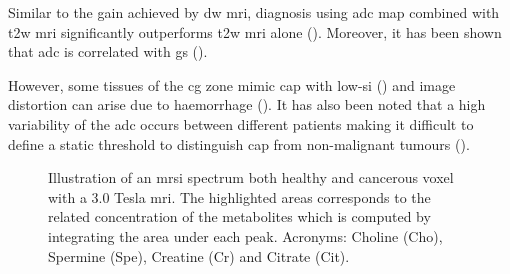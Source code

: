 \begin{enumerate}[leftmargin=*]
Similar to the gain achieved by \ac{dw} \ac{mri}, diagnosis using \ac{adc} map combined with \ac{t2w} \ac{mri} significantly outperforms \ac{t2w} \ac{mri} alone (\cite{Doo2012,Choi2007}). Moreover, it has been shown that \ac{adc} is correlated with \ac{gs} (\cite{Hambrock2011, Itou2011, Peng2013}).

However, some tissues of the \ac{cg} zone mimic \ac{cap} with low-\ac{si} (\cite{Kirkham2006}) and image distortion can arise due to haemorrhage (\cite{Choi2007}). It has also been noted that a high variability of the \ac{adc} occurs between different patients making it difficult to define a static threshold to distinguish \ac{cap} from non-malignant tumours (\cite{Choi2007}). 

\begin{figure}
	\centering
	\hspace*{\fill}
	 \hfill
	\hspace*{\fill}
	\caption{Illustration of an \ac{mrsi} spectrum both healthy and cancerous voxel with a 3.0 Tesla \ac{mri}. The highlighted areas corresponds to the related concentration of the metabolites which is computed by integrating the area under each peak. Acronyms: Choline (Cho), Spermine (Spe), Creatine (Cr) and Citrate (Cit).}
	\label{fig:mrsi}
\end{figure}


\end{enumerate}
